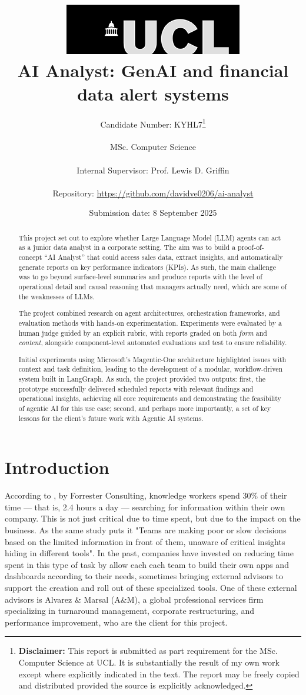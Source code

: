 \documentclass[a4paper]{report}
\title{{\vspace{-14em} \includegraphics[scale=0.4]{images/ucl_logo.png}}\\
{{\Huge AI Analyst: GenAI and financial data alert systems}}\\
}
\date{Submission date: 8 September 2025}
\author{Candidate Number: KYHL7\thanks{
{\bf Disclaimer:}
This report is submitted as part requirement for the MSc. Computer Science at UCL. It is substantially the result of my own work except where explicitly indicated in the text. The report may be freely copied and distributed provided the source is explicitly acknowledged.}
\\ \\
MSc. Computer Science\\ \\
Internal Supervisor: Prof. Lewis D. Griffin\\ \\
Repository: \url{https://github.com/davidve0206/ai-analyst}}
\begin{document}
 
\onehalfspacing

\maketitle


\tableofcontents

\setcounter{page}{1}
\begin{abstract}
This project set out to explore whether Large Language Model (LLM) agents can act as a junior data analyst in a corporate setting. The aim was to build a proof-of-concept “AI Analyst” that could access sales data, extract insights, and automatically generate reports on key performance indicators (KPIs). As such, the main challenge was to go beyond surface-level summaries and produce reports with the level of operational detail and causal reasoning that managers actually need, which are some of the weaknesses of LLMs.

The project combined research on agent architectures, orchestration frameworks, and evaluation methods with hands-on experimentation. Experiments were evaluated by a human judge guided by an explicit rubric, with reports graded on both \textit{form} and \textit{content}, alongside component-level automated evaluations and test to ensure reliability.

Initial experiments using Microsoft’s Magentic-One architecture highlighted issues with context and task definition, leading to the development of a modular, workflow-driven system built in LangGraph. As such, the project provided two outputs: first, the prototype successfully delivered scheduled reports with relevant findings and operational insights, achieving all core requirements and demonstrating the feasibility of agentic AI for this use case; second, and perhaps more importantly, a set of key lessons for the client's future work with Agentic AI systems.
\end{abstract}

\chapter{Introduction}
\label{chapter:introduction}

According to \cite{forrester2022}, by Forrester Consulting, knowledge workers spend 30\% of their time --- that is, 2.4 hours a day --- searching for information within their own company. This is not just critical due to time spent, but due to the impact on the business. As the same study puts it "Teams are making poor or slow decisions based on the limited information in front of them, unaware of critical insights hiding in different tools". In the past, companies have invested on reducing time spent in this type of task by allow each each team to build their own apps and dashboards according to their needs, sometimes bringing external advisors to support the creation and roll out of these specialized tools. One of these external advisors is Alvarez \& Marsal (A\&M), a global professional services firm specializing in turnaround management, corporate restructuring, and performance improvement, who are the client for this project.
\end{document}
